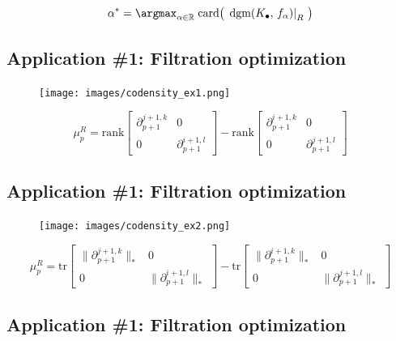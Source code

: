 \documentclass[
  letterpaper,
  DIV=11,
  numbers=noendperiod,
  oneside]{scrartcl}
\begin{document}
\[ 
\alpha^\ast = \argmax_{\alpha \in \mathbb{R}} \; \mathrm{card}\big(\, \left.\mathrm{dgm}(K_\bullet, \, f_\alpha) \right|_{R} \, \big) 
\]

\subsection{Application \#1: Filtration
optimization}\label{application-1-filtration-optimization-2}

\begin{figure}

{\centering \texttt{[image: images/codensity\_ex1.png]}

}

\end{figure}

\[ 
    \mu_p^{R} = 
    \mathrm{rank}\begin{bmatrix} \partial_{p+1}^{j + 1, k} & 0 \\
    0 & \partial_{p+1}^{i + 1, l}
    \end{bmatrix}
    - 
    \mathrm{rank}\begin{bmatrix} \partial_{p+1}^{i + 1, k} & 0 \\
    0 & \partial_{p+1}^{j + 1, l}
    \end{bmatrix}
\]

\subsection{Application \#1: Filtration
optimization}\label{application-1-filtration-optimization-3}

\begin{figure}

{\centering \texttt{[image: images/codensity\_ex2.png]}

}

\end{figure}

\[ 
\mu_p^{R} = 
\mathrm{tr}\begin{bmatrix} \lVert \partial_{p+1}^{j + 1, k} \rVert_\ast & 0 \\
0 & \lVert \partial_{p+1}^{i + 1, l} \rVert_{\ast}
\end{bmatrix}
- 
\mathrm{tr}\begin{bmatrix} \lVert \partial_{p+1}^{i + 1, k} \rVert_\ast & 0 \\
0 & \lVert  \partial_{p+1}^{j + 1, l} \rVert_\ast
\end{bmatrix}
\]

\subsection{Application \#1: Filtration
optimization}\label{application-1-filtration-optimization-4}
\end{document}
